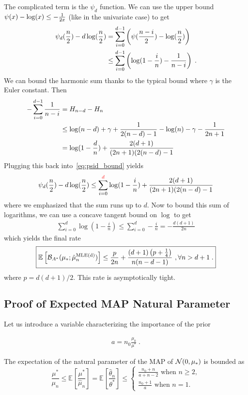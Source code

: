 \documentclass{article}
\newcommand*{\expect}[2][]{\ensuremath{\mathbb{E}_{#1} \left[ #2 \right] }} %
\newcommand{\logpart}{A}
\newcommand{\bregmanconj}{\cB_{\logpart^*}}
\newcommand{\nat}{\theta}
\newcommand{\MAPm}{\hat \mu_n}
\newcommand{\MAPt}{\hat \nat_n}
\begin{document}
The complicated term is the $\psi_d$ function.
We can use the upper bound $\psi(x) - \log(x) \leq - \inv{2x}$ (like in the univariate case) to get
\begin{align}
	\psi_d(\half[n]) - d \log(\half[n]) 
	&= \sum_{i=0}^{d-1} \paren{\psi ( \half[n - i]) - \log(\half[n]) } \\
	&\leq \sum_{i=0}^{d-1} \paren{\log(1 - \frac{i}{n}) - \frac{1}{n-i}} \; .
	\label{eq:psid_bound}
\end{align}
We can bound the harmonic sum thanks to the typical bound
where $\gamma$ is the Euler constant. Then
\begin{align}
	- \sum_{i=0}^{d-1} \frac{1}{n-i} 
	&= H_{n-d} - H_n \\
	&\leq \log(n-d) + \gamma + \inv{2(n-d) - 1} - \log(n) - \gamma - \inv{2n+1}\\
	&= \log(1-\frac{d}{n})  + \frac{2(d + 1)}{(2n+1)(2(n - d) - 1}
\end{align}
Plugging this back into~\eqref{eq:psid_bound} yields
\begin{align}
	\psi_d(\half[n]) - d \log(\half[n]) 
	\leq \sum_{i=0}^{\textcolor{red}{d}} \log(1 - \frac{i}{n})
	+ \frac{2(d + 1)}{(2n+1)(2(n - d) - 1} 
\end{align}
where we emphasized that the sum runs up to $d$.
Now to bound this sum of logarithms, we can use a concave tangent bound on $\log$ to get
\begin{align}
	\sum_{i=0}^{d} \log(1 - \frac{i}{n})
	\leq \sum_{i=0}^{d} - \frac{i}{n}
	 = -\frac{d(d+1)}{2n}
\end{align}
which yields the final rate
\begin{align}
 	\boxed{
 	\expect{\bregmanconj( \mu_*; \hat \mu_n^\text{MLE(d)})}
 	\leq \frac{p}{2n} + \frac{(d+1) \paren{p + \inv{4}}}{n (n - d -1)}
 	\ , \forall n >d+1 \;.
 	}
\end{align}
where $p = d(d+1)/2$.
This rate is asymptotically tight.

\subsection{Proof of Expected MAP Natural Parameter}
Let us introduce a variable characterizing the importance of the prior
\begin{important}
	\begin{align}
			a=n_0 \frac{\mu_0}{\mu^*} \; .
	\end{align}
\end{important}
\begin{lemma}
	The expectation of the natural parameter of the MAP of $\cN(0,\mu_*)$ is bounded as
\begin{equation}
		\frac{\mu^*}{\mu_n}
		\leq \expect{\frac{\mu^*}{\MAPm}} 
		= \expect{\frac{\MAPt}{\nat^*}} 
		\leq \begin{cases}
		\frac{n_0 +n}{a+n-2} \text{ when } n\geq 2,\\
		\frac{n_0 +1}{a} \text{ when } n=1.
		\end{cases}
		\label{eq:lemma_natp_bound}
	\end{equation}
\end{lemma}
\end{document}
